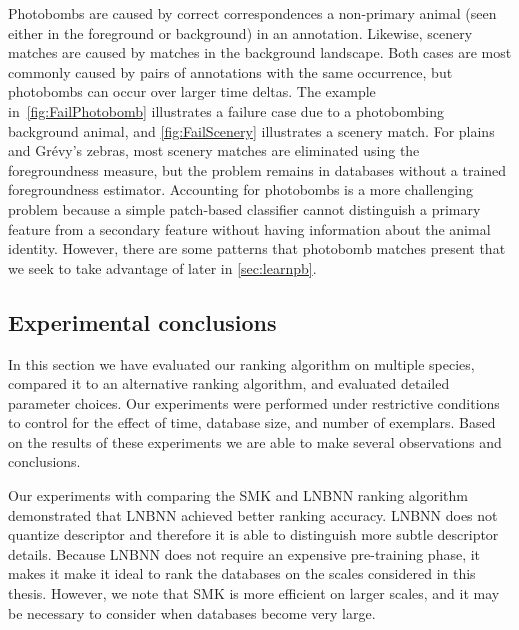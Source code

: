             Photobombs are caused by correct correspondences a non-primary animal (seen either in the foreground or
            background) in an annotation. Likewise, scenery matches are caused by matches in the background
            landscape. Both cases are most commonly caused by pairs of annotations with the same occurrence, but
            photobombs can occur over larger time deltas. The example in~\cref{fig:FailPhotobomb} illustrates a
            failure case due to a photobombing background animal, and \cref{fig:FailScenery} illustrates a scenery
            match. For plains and Grévy's zebras, most scenery matches are eliminated using the foregroundness
            measure, but the problem remains in databases without a trained foregroundness estimator. Accounting
            for photobombs is a more challenging problem because a simple patch-based classifier cannot distinguish
            a primary feature from a  secondary feature without having information about the animal identity.
            However, there are some patterns that photobomb matches present that we seek to take advantage of later
            in \cref{sec:learnpb}.

            \FailScenery{}
            \FailPhotobomb{}

    \FloatBarrier{}
    \subsection{Experimental conclusions}\label{sub:exptsum}  

        In this section we have evaluated our ranking algorithm on multiple species, compared it to an alternative
        ranking algorithm, and evaluated detailed parameter choices. Our experiments were performed under
        restrictive conditions to control for the effect of time, database size, and number of exemplars. Based on
        the results of these experiments we are able to make several observations and conclusions.

        Our experiments with comparing the SMK and LNBNN ranking algorithm demonstrated that LNBNN achieved
          better ranking accuracy.
        LNBNN does not quantize descriptor and therefore it is able to distinguish more subtle descriptor
          details.
        Because LNBNN does not require an expensive pre-training phase, it makes it make it ideal to rank the
          databases on the scales considered in this thesis.
        However, we note that SMK is more efficient on larger scales, and it may be necessary to consider when
          databases become very large.


